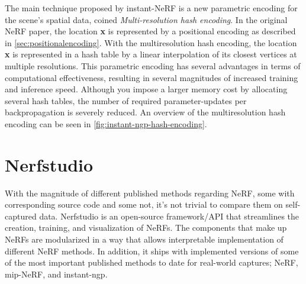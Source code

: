The main technique proposed by instant-NeRF is a new parametric encoding for the scene's spatial data, coined \textit{Multi-resolution hash encoding}. In the original NeRF paper, the location \textbf{x} is represented by a positional encoding as described in \autoref{sec:positionalencoding}. With the multiresolution hash encoding, the location \textbf{x} is represented in a hash table by a linear interpolation of its closest vertices at multiple resolutions. This parametric encoding has several advantages in terms of computational effectiveness, resulting in several magnitudes of increased training and inference speed. Although you impose a larger memory cost by allocating several hash tables, the number of required parameter-updates per backpropagation is severely reduced. An overview of the multiresolution hash encoding can be seen in \autoref{fig:instant-ngp-hash-encoding}.





\section{Nerfstudio} \label{sec:nerfstudio}
With the magnitude of different published methods regarding NeRF, some with corresponding source code and some not, it's not trivial to compare them on self-captured data. Nerfstudio \cite{nerfstudio} is an open-source framework/API that streamlines the creation, training, and visualization of NeRFs. The components that make up NeRFs are modularized in a way that allows interpretable implementation of different NeRF methods. In addition, it ships with implemented versions of some of the most important published methods to date for real-world captures; NeRF, mip-NeRF, and instant-ngp.

